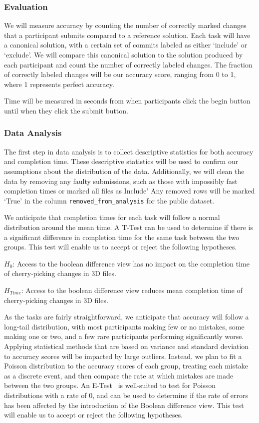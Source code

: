 \documentclass[sigconf,authorversion,nonacm]{acmart}
\begin{document}
\subsubsection{Evaluation}

We will measure accuracy by counting the number of correctly marked changes that a participant submits compared to a reference solution. 
Each task will have a canonical solution, with a certain set of commits labeled as either `include' or `exclude'.
We will compare this canonical solution to the solution produced by each participant and count the number of correctly labeled changes.
The fraction of correctly labeled changes will be our accuracy score, ranging from 0 to 1, where 1 represents perfect accuracy.

Time will be measured in seconds from when participants click the begin button until when they click the submit button.

\subsubsection{Data Analysis}

The first step in data analysis is to collect descriptive statistics for both accuracy and completion time.
These descriptive statistics will be used to confirm our assumptions about the distribution of the data. 
Additionally, we will clean the data by removing any faulty submissions, such as those with impossibly fast completion times or marked all files as Include'
Any removed rows will be marked `True' in the column \texttt{removed\_from\_analysis} for the public dataset.

We anticipate that completion times for each task will follow a normal distribution around the mean time. 
A T-Test can be used to determine if there is a significant difference in completion time for the same task between the two groups. 
This test will enable us to accept or reject the following hypotheses.

$H_{0}$: Access to the boolean difference view has no impact on the completion time of cherry-picking changes in 3D files.

$H_{Time}$: Access to the boolean difference view reduces mean completion time of cherry-picking changes in 3D files.

As the tasks are fairly straightforward, we anticipate that accuracy will follow a long-tail distribution, with most participants making few or no mistakes, some making one or two, and a few rare participants performing significantly worse. 
Applying statistical methods that are based on variance and standard deviation to accuracy scores will be impacted by large outliers. 
Instead, we plan to fit a Poisson distribution to the accuracy scores of each group, treating each mistake as a discrete event, and then compare the rate at which mistakes are made between the two groups. 
An E-Test~\cite{krishnamoorthy2004more} is well-suited to test for Poisson distributions with a rate of 0, and can be used to determine if the rate of errors has been affected by the introduction of the Boolean difference view. This test will enable us to accept or reject the following hypotheses.
\end{document}
